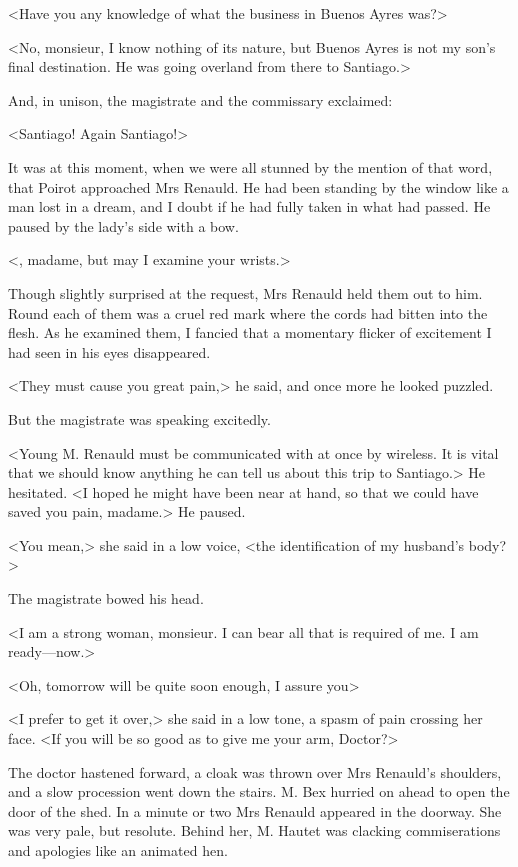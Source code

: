  <Have you any knowledge of what the business in Buenos Ayres was?> 

 <No, monsieur, I know nothing of its nature, but Buenos Ayres is not my son's final destination. He was going overland from there to Santiago.> 

 And, in unison, the magistrate and the commissary exclaimed: 

 <Santiago! Again Santiago!> 

 It was at this moment, when we were all stunned by the mention of that word, that Poirot approached Mrs Renauld. He had been standing by the window like a man lost in a dream, and I doubt if he had fully taken in what had passed. He paused by the lady's side with a bow. 

 <, madame, but may I examine your wrists.> 

 Though slightly surprised at the request, Mrs Renauld held them out to him. Round each of them was a cruel red mark where the cords had bitten into the flesh. As he examined them, I fancied that a momentary flicker of excitement I had seen in his eyes disappeared. 

 <They must cause you great pain,> he said, and once more he looked puzzled. 

 But the magistrate was speaking excitedly. 

 <Young M. Renauld must be communicated with at once by wireless. It is vital that we should know anything he can tell us about this trip to Santiago.> He hesitated. <I hoped he might have been near at hand, so that we could have saved you pain, madame.> He paused. 

 <You mean,> she said in a low voice, <the identification of my husband's body?> 

 The magistrate bowed his head. 

 <I am a strong woman, monsieur. I can bear all that is required of me. I am ready—now.> 

 <Oh, tomorrow will be quite soon enough, I assure you\longdash> 

 <I prefer to get it over,> she said in a low tone, a spasm of pain crossing her face. <If you will be so good as to give me your arm, Doctor?> 

 The doctor hastened forward, a cloak was thrown over Mrs Renauld's shoulders, and a slow procession went down the stairs. M. Bex hurried on ahead to open the door of the shed. In a minute or two Mrs Renauld appeared in the doorway. She was very pale, but resolute. Behind her, M. Hautet was clacking commiserations and apologies like an animated hen. 

